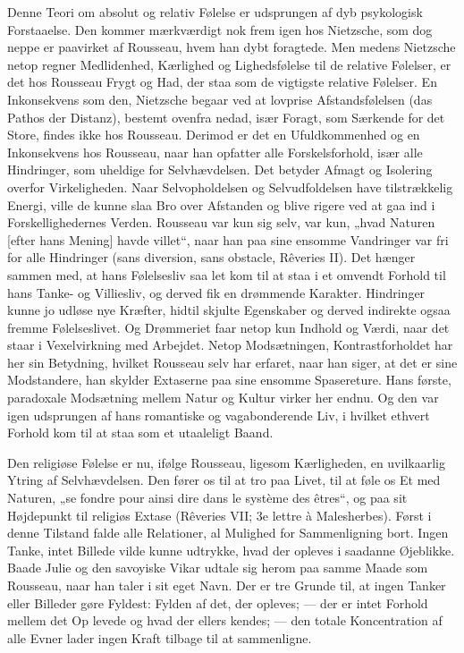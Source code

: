 \documentclass[12pt,a4paper,openany]{book}
\newcommand{\opage}[1]{\marginnote{\footnotesize\textit{[#1]}}}
\begin{document}
Denne Teori om absolut og relativ Følelse er udsprungen
af dyb psykologisk Forstaaelse. Den kommer mærkværdigt nok
frem igen hos Nietzsche, som dog neppe er paavirket af Rousseau,
hvem han dybt foragtede. Men medens Nietzsche netop
regner Medlidenhed, Kærlighed og Lighedsfølelse til de relative
Følelser, er det hos Rousseau Frygt og Had, der staa som de
vigtigste relative Følelser. En Inkonsekvens som den, Nietzsche
\setcounter{footnote}{0}%
\opage{148}begaar ved at lovprise Afstandsfølelsen (das Pathos der Distanz),
bestemt ovenfra nedad, især Foragt, som Særkende for det Store,
findes ikke hos Rousseau. Derimod er det en Ufuldkommenhed
og en Inkonsekvens hos Rousseau, naar han opfatter alle Forskelsforhold,
især alle Hindringer, som uheldige for Selvhævdelsen.
Det betyder Afmagt og Isolering overfor Virkeligheden.
Naar Selvopholdelsen og Selvudfoldelsen have tilstrækkelig Energi,
ville de kunne slaa Bro over Afstanden og blive rigere ved at
gaa ind i Forskellighedernes Verden. Rousseau var kun sig
selv, var kun, „hvad Naturen [efter hans Mening] havde villet“,
naar han paa sine ensomme Vandringer var fri for alle Hindringer
(sans diversion, sans obstacle, Rêveries II). Det hænger
sammen med, at hans Følelsesliv saa let kom til at staa i et
omvendt Forhold til hans Tanke- og Villiesliv, og derved fik en
drømmende Karakter. Hindringer kunne jo udløse nye Kræfter,
hidtil skjulte Egenskaber og derved indirekte ogsaa fremme
Følelseslivet. Og Drømmeriet faar netop kun Indhold og Værdi,
naar det staar i Vexelvirkning med Arbejdet. Netop Modsætningen,
Kontrastforholdet har her sin Betydning, hvilket Rousseau
selv har erfaret, naar han siger, at det er sine Modstandere,
han skylder Extaserne paa sine ensomme Spasereture.
Hans første, paradoxale Modsætning mellem Natur og Kultur
virker her endnu. Og den var igen udsprungen af hans romantiske
og vagabonderende Liv, i hvilket ethvert Forhold kom til
at staa som et utaaleligt Baand.

Den religiøse Følelse er nu, ifølge Rousseau, ligesom Kærligheden,
en uvilkaarlig Ytring af Selvhævdelsen. Den fører os
til at tro paa Livet, til at føle os Et med Naturen, „se fondre
pour ainsi dire dans le système des êtres“, og paa sit Højdepunkt
til religiøs Extase (Rêveries VII; 3e lettre à Malesherbes).
Først i denne Tilstand falde alle Relationer, al Mulighed for
Sammenligning bort. Ingen Tanke, intet Billede vilde kunne
udtrykke, hvad der opleves i saadanne Øjeblikke. Baade Julie
og den savoyiske Vikar udtale sig herom paa samme Maade
som Rousseau, naar han taler i sit eget Navn. Der er tre
Grunde til, at ingen Tanker eller Billeder gøre Fyldest: Fylden
af det, der opleves; --- der er intet Forhold mellem det Op%
\setcounter{footnote}{0}%
\opage{149}levede og hvad der ellers kendes; --- den totale Koncentration
af alle Evner lader ingen Kraft tilbage til at sammenligne.
\end{document}
